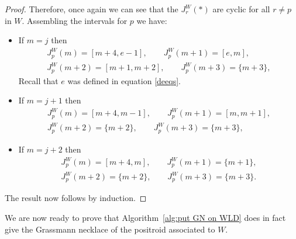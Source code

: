 \documentclass[11pt]{article}
\theoremstyle{remark}
\theoremstyle{definition}
\begin{document}
\begin{proof}
Therefore, once again we can see that the $J_r^{W}(*)$ are cyclic for all $r\neq p$ in $W$.  Assembling the intervals for $p$ we have:
\begin{itemize}
\item If $m=j$ then
\begin{gather*}J_p^{W}(m) = [m+4,e-1], \qquad  J_p^{W}(m+1) = [e,m], \\  J_p^{W}(m+2) = [m+1,m+2], \qquad  J_p^{W}(m+3) = \{m+3\},\end{gather*}
Recall that $e$ was defined in equation \eqref{deeqs}.
\item If $m=j+1$ then
\begin{gather*}J_p^{W}(m) = [m+4,m-1], \qquad J_p^{W}(m+1) = [m,m+1], \\  J_p^{W}(m+2) = \{m+2\}, \qquad  J_p^{W}(m+3) = \{m+3\},\end{gather*}
\item If $m=j+2$ then
\begin{gather*}J_p^{W}(m) = [m+4,m], \qquad  J_p^{W}(m+1) = \{m+1\}, \\  J_p^{W}(m+2) = \{m+2\}, \qquad  J_p^{W}(m+3) = \{m+3\}.\end{gather*}
\end{itemize}
The result now follows by induction.
\end{proof}



We are now ready to prove that Algorithm~\ref{alg:put GN on WLD} does in fact give the Grassmann necklace of the positroid associated to $W$.
\end{document}
